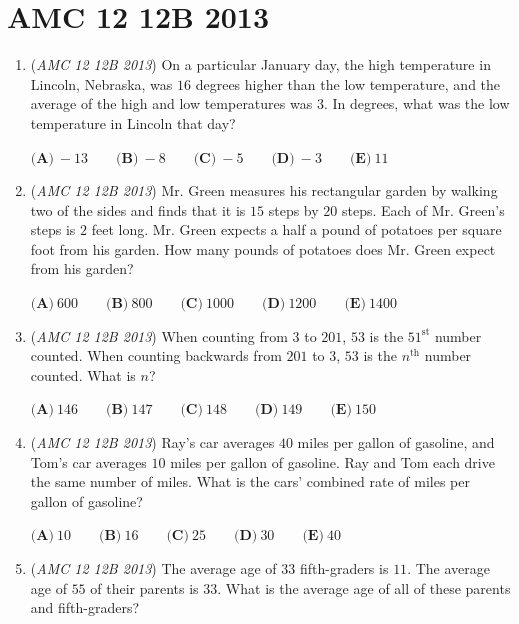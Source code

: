 \section{AMC 12 12B 2013}
        \begin{enumerate}
        	\item (\textit{AMC 12 12B 2013}) On a particular January day, the high temperature in Lincoln, Nebraska, was $16$ degrees higher than the low temperature, and the average of the high and low temperatures was $3$. In degrees, what was the low temperature in Lincoln that day?


 $\textbf{(A)}\ -13 \qquad \textbf{(B)}\ -8 \qquad \textbf{(C)}\ -5 \qquad \textbf{(D)}\ -3 \qquad \textbf{(E)}\ 11$


	\item (\textit{AMC 12 12B 2013}) Mr. Green measures his rectangular garden by walking two of the sides and finds that it is $15$ steps by $20$ steps. Each of Mr. Green’s steps is $2$ feet long. Mr. Green expects a half a pound of potatoes per square foot from his garden. How many pounds of potatoes does Mr. Green expect from his garden?


 $\textbf{(A)}\ 600 \qquad \textbf{(B)}\ 800 \qquad \textbf{(C)}\ 1000 \qquad \textbf{(D)}\ 1200 \qquad \textbf{(E)}\ 1400$


	\item (\textit{AMC 12 12B 2013}) When counting from $3$ to $201$, $53$ is the $51^{\text{st}}$ number counted. When counting backwards from $201$ to $3$, $53$ is the $n^{\text{th}}$ number counted. What is $n$?


 $\textbf{(A)}\ 146 \qquad \textbf{(B)}\ 147 \qquad \textbf{(C)}\ 148 \qquad \textbf{(D)}\ 149 \qquad \textbf{(E)}\ 150$


	\item (\textit{AMC 12 12B 2013}) Ray's car averages $40$ miles per gallon of gasoline, and Tom's car averages $10$ miles per gallon of gasoline. Ray and Tom each drive the same number of miles. What is the cars' combined rate of miles per gallon of gasoline?



 $\textbf{(A)}\ 10 \qquad \textbf{(B)}\ 16 \qquad \textbf{(C)}\ 25 \qquad \textbf{(D)}\ 30 \qquad \textbf{(E)}\ 40$


	\item (\textit{AMC 12 12B 2013}) The average age of $33$ fifth-graders is $11$. The average age of $55$ of their parents is $33$. What is the average age of all of these parents and fifth-graders?



\end{enumerate}
